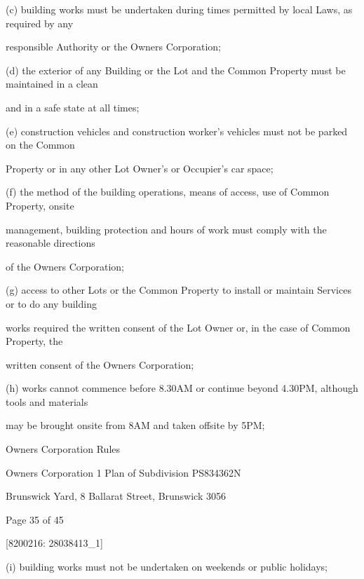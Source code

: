 \documentclass{article}
\begin{document}
{\fontsize{9.962}{1}(c) building works must be undertaken during times permitted by local Laws, as required by any }

{\fontsize{10.02}{1}responsible Authority or the Owners Corporation; }

{\fontsize{9.962}{1}(d) the exterior of any Building or the Lot and the Common Property must be maintained in a clean }

{\fontsize{10.02}{1}and in a safe state at all times; }

{\fontsize{9.962}{1}(e) construction vehicles and construction worker’s vehicles must not be parked on the Common }

{\fontsize{10.02}{1}Property or in any other Lot Owner’s or Occupier’s car space; }

{\fontsize{9.962}{1}(f) the method of the building operations, means of access, use of Common Property, onsite }

{\fontsize{10.02}{1}management, building protection and hours of work must comply with the reasonable directions }

{\fontsize{10.02}{1}of the Owners Corporation; }

{\fontsize{9.962}{1}(g) access to other Lots or the Common Property to install or maintain Services or to do any building }

{\fontsize{10.02}{1}works required the written consent of the Lot Owner or, in the case of Common Property, the }

{\fontsize{10.02}{1}written consent of the Owners Corporation; }

{\fontsize{9.962}{1}(h) works cannot commence before 8.30AM or continue beyond 4.30PM, although tools and materials }

{\fontsize{10.02}{1}may be brought onsite from 8AM and taken offsite by 5PM; }

\newpage





{\fontsize{9}{1}Owners Corporation Rules }

{\fontsize{9}{1}Owners Corporation 1 Plan of Subdivision PS834362N }

{\fontsize{9}{1}Brunswick Yard, 8 Ballarat Street, Brunswick 3056 }


{\fontsize{9}{1}Page 35  of 45 }



{\fontsize{7.02}{1}[8200216: 28038413\_1] }

{\fontsize{9.962}{1}(i) building works must not be undertaken on weekends or public holidays; }
\end{document}
